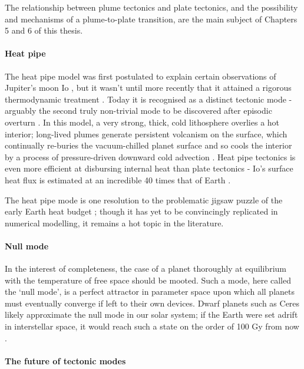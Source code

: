 \documentclass[a4paper,11pt,oneside]{book}
\begin{document}
The relationship between plume tectonics and plate tectonics, and the possibility and mechanisms of a plume-to-plate transition, are the main subject of Chapters 5 and 6 of this thesis.

\paragraph{Heat pipe}

The heat pipe model was first postulated to explain certain observations of Jupiter's moon Io \cite{OReilly1981-fr}, but it wasn't until more recently that it attained a rigorous thermodynamic treatment \cite{Moore2001-yb}. Today it is recognised as a distinct tectonic mode - arguably the second truly non-trivial mode to be discovered after episodic overturn \cite{Stevenson2003-of}. In this model, a very strong, thick, cold lithosphere overlies a hot interior; long-lived plumes generate persistent volcanism on the surface, which continually re-buries the vacuum-chilled planet surface and so cools the interior by a process of pressure-driven downward cold advection \cite{Moore2017-fx}. Heat pipe tectonics is even more efficient at disbursing internal heat than plate tectonics - Io's surface heat flux is estimated at an incredible 40 times that of Earth \cite{Veeder2012-ds}.

The heat pipe mode is one resolution to the problematic jigsaw puzzle of the early Earth heat budget \citet{Moore2013-oe, Griffin2014-xo}; though it has yet to be convincingly replicated in numerical modelling, it remains a hot topic in the literature.

\paragraph{Null mode}

In the interest of completeness, the case of a planet thoroughly at equilibrium with the temperature of free space should be mooted. Such a mode, here called the `null mode', is a perfect attractor in parameter space upon which all planets must eventually converge if left to their own devices. Dwarf planets such as Ceres likely approximate the null mode in our solar system; if the Earth were set adrift in interstellar space, it would reach such a state on the order of 100 Gy from now \cite{De_Pater2015-sq}.

\paragraph{The future of tectonic modes}
\end{document}
